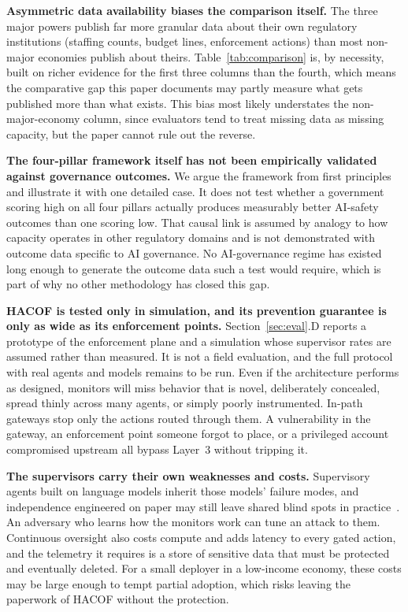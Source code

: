 \documentclass{ieeeaccess}
\newcommand{\hacof}{HACOF}
\begin{document}
\textbf{Asymmetric data availability biases the comparison itself.} The three major powers publish far more granular data about their own regulatory institutions (staffing counts, budget lines, enforcement actions) than most non-major economies publish about theirs. Table~\ref{tab:comparison} is, by necessity, built on richer evidence for the first three columns than the fourth, which means the comparative gap this paper documents may partly measure what gets published more than what exists. This bias most likely understates the non-major-economy column, since evaluators tend to treat missing data as missing capacity, but the paper cannot rule out the reverse.

\textbf{The four-pillar framework itself has not been empirically validated against governance outcomes.} We argue the framework from first principles and illustrate it with one detailed case. It does not test whether a government scoring high on all four pillars actually produces measurably better AI-safety outcomes than one scoring low. That causal link is assumed by analogy to how capacity operates in other regulatory domains and is not demonstrated with outcome data specific to AI governance. No AI-governance regime has existed long enough to generate the outcome data such a test would require, which is part of why no other methodology has closed this gap.

\textbf{\hacof{} is tested only in simulation, and its prevention guarantee is only as wide as its enforcement points.} Section~\ref{sec:eval}.D reports a prototype of the enforcement plane and a simulation whose supervisor rates are assumed rather than measured. It is not a field evaluation, and the full protocol with real agents and models remains to be run. Even if the architecture performs as designed, monitors will miss behavior that is novel, deliberately concealed, spread thinly across many agents, or simply poorly instrumented. In-path gateways stop only the actions routed through them. A vulnerability in the gateway, an enforcement point someone forgot to place, or a privileged account compromised upstream all bypass Layer~3 without tripping it.

\textbf{The supervisors carry their own weaknesses and costs.} Supervisory agents built on language models inherit those models' failure modes, and independence engineered on paper may still leave shared blind spots in practice~\cite{kim2025correlated}.
An adversary who learns how the monitors work can tune an attack to them. Continuous oversight also costs compute and adds latency to every gated action, and the telemetry it requires is a store of sensitive data that must be protected and eventually deleted. For a small deployer in a low-income economy, these costs may be large enough to tempt partial adoption, which risks leaving the paperwork of \hacof{} without the protection.
\end{document}
